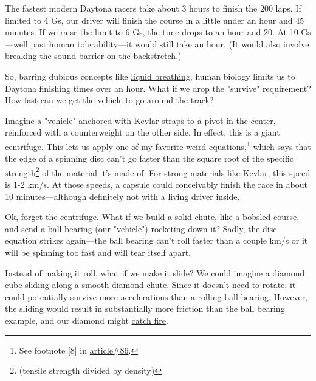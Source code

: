 {{The fastest modern Daytona racers take about 3 hours to finish the 200 laps. If limited to 4 Gs, our driver will finish the course in a little under an hour and 45 minutes. If we raise the limit to 6 Gs, the time drops to an hour and 20. At 10 Gs—well past human tolerability—it would still take an hour. (It would also involve breaking the sound barrier on the backstretch.)}

{So, barring dubious concepts like \href{http://en.wikipedia.org/wiki/Liquid\_breathing}{liquid breathing}, human biology limits us to Daytona finishing times over an hour. What if we drop the "survive" requirement? How fast can we get the vehicle to go around the track?}

{Imagine a "vehicle" anchored with Kevlar straps to a pivot in the center, reinforced with a counterweight on the other side. In effect, this is a giant centrifuge. This lets us apply one of my favorite weird equations,{\footnote{See footnote [8] in \href{http://what-if.xkcd.com/86/}{article\#86}.} } which says that the edge of a spinning disc can't go faster than the square root of the specific strength{\footnote{(tensile strength divided by density)} } of the material it's made of. For strong materials like Kevlar, this speed is 1-2 km/s. At those speeds, a capsule could conceivably finish the race in about 10 minutes—although definitely not with a living driver inside.}

{Ok, forget the centrifuge. What if we build a solid chute, like a bobsled course, and send a ball bearing (our "vehicle") rocketing down it? Sadly, the disc equation strikes again—the ball bearing can't roll faster than a couple km/s or it will be spinning too fast and will tear itself apart.}

{Instead of making it roll, what if we make it slide? We could imagine a diamond cube sliding along a smooth diamond chute. Since it doesn't need to rotate, it could potentially survive more accelerations than a rolling ball bearing. However, the sliding would result in substantially more friction than the ball bearing example, and our diamond might \href{https://www.youtube.com/watch?v=WWpm6\_Y7ASI}{catch fire}.}

}
